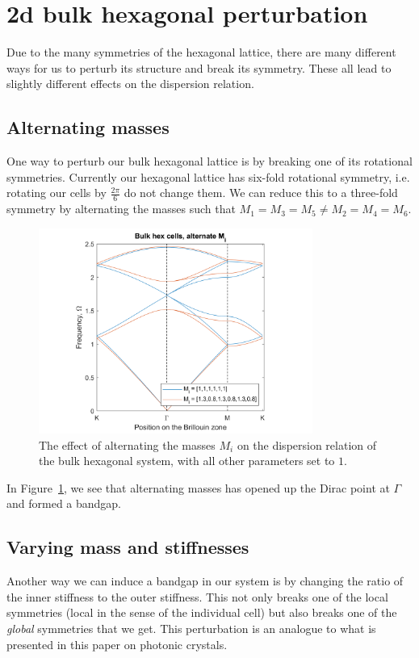 \section{2d bulk hexagonal perturbation}
Due to the many symmetries of the hexagonal lattice, there are many different
ways for us to perturb its structure and break its symmetry. These all lead to
slightly different effects on the dispersion relation.

\subsection{Alternating masses}
One way to perturb our bulk hexagonal lattice is by breaking one of its
rotational symmetries. Currently our hexagonal lattice has six-fold rotational
symmetry, i.e. rotating our cells by $\frac{2\pi}{6}$ do not change them. We can
reduce this to a three-fold symmetry by alternating the masses such that
$M_1=M_3=M_5 \neq M_2=M_4=M_6$.

\begin{figure}[!h]
\centering
\includegraphics[width=0.8\textwidth]{imgs/hexperturbM.png}
\caption{\label{fig:hexM} The effect of alternating the masses $M_i$ on the
  dispersion relation of the bulk hexagonal system, with all other parameters
  set to $1$.}
\end{figure}

In Figure~\ref{fig:hexM}, we see that alternating masses has opened up the
Dirac point at $\Gamma$ and formed a bandgap.

\subsection{Varying mass and stiffnesses}
Another way we can induce a bandgap in our system is by changing the ratio of
the inner stiffness to the outer stiffness. This not only breaks one of the
local symmetries (local in the sense of the individual cell) but also breaks
one of the \textit{global} symmetries that we get. This perturbation is an
analogue to what is presented in this paper on photonic crystals.\cite{wuandhu}

